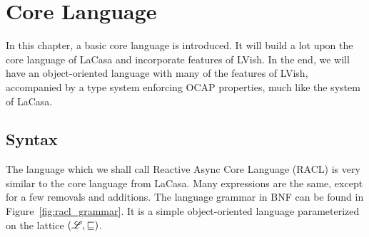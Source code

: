 \chapter{Core Language}%
\label{cha:core_language}

In this chapter, a basic core language is introduced. It will build a lot upon
the core language of LaCasa and incorporate features of LVish. In the end, we will
have an object-oriented language with many of the features of LVish, accompanied
by a type system enforcing OCAP properties, much like the system of LaCasa.

\section{Syntax}
\label{sec:syntax}

The language which we shall call Reactive Async Core Language (RACL) is very
similar to the core language from LaCasa. Many expressions are the same, except
for a few removals and additions. The language grammar in BNF can be found in
Figure~\ref{fig:racl_grammar}. It is a simple object-oriented language
parameterized on the lattice $(\mbox{$\mathscr{L}$}, \sqsubseteq)$.

